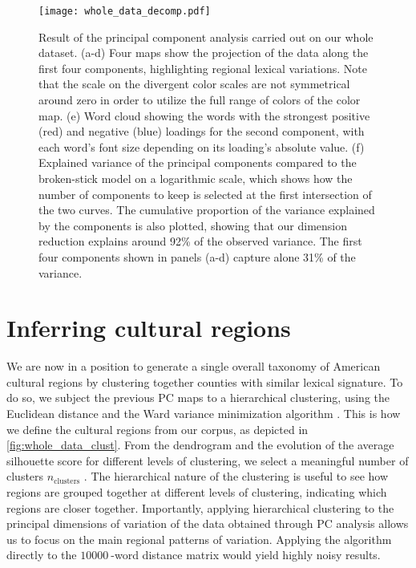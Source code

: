 \documentclass[../thesis.tex]{subfiles}
\begin{document}
\begin{figure}[ht!]
\centering
  \texttt{[image: whole\_data\_decomp.pdf]}
  \caption{Result of the principal component analysis carried out on our whole dataset.
  (a-d) Four maps show the projection of the data along the first four components,
  highlighting regional lexical variations. Note that the scale on the divergent color
  scales are not symmetrical around zero in order to utilize the full range of colors of
  the color map. (e) Word cloud showing the words with the strongest positive (red) and
  negative (blue) loadings for the second component, with each word's font size
  depending on its loading's absolute value. (f) Explained variance of the principal
  components compared to the broken-stick model on a logarithmic scale, which shows how
  the number of components to keep is selected at the first intersection of the two
  curves. The cumulative proportion of the variance explained by the components is also
  plotted, showing that our dimension reduction explains around 92\% of the observed
  variance. The first four components shown in panels (a-d) capture alone 31\% of the
  variance.}
  \label{fig:whole_data_decomp}
\end{figure}


\section{Inferring cultural regions}

We are now in a position to generate a single overall taxonomy of American cultural
regions by clustering together counties with similar lexical signature. To do so, we
subject the previous \ac{PC} maps to a hierarchical clustering, using the Euclidean
distance and the Ward variance minimization algorithm \cite{EverittClusterAnalysis2011}.
This is how we define the cultural regions from our corpus, as depicted in
\cref{fig:whole_data_clust}. From the dendrogram and the evolution of the average
silhouette score for different levels of clustering, we select a meaningful number of
clusters $n_{\text{clusters}}$ \cite{RousseeuwSilhouettesGraphical1987}. The
hierarchical nature of the clustering is useful to see how regions are grouped together
at different levels of clustering, indicating which regions are closer together.
Importantly, applying hierarchical clustering to the principal dimensions of variation
of the data obtained through \ac{PC} analysis allows us to focus on the main regional
patterns of variation. Applying the algorithm directly to the $\SI{10000}{}$-word
distance matrix would yield highly noisy results.
\end{document}

